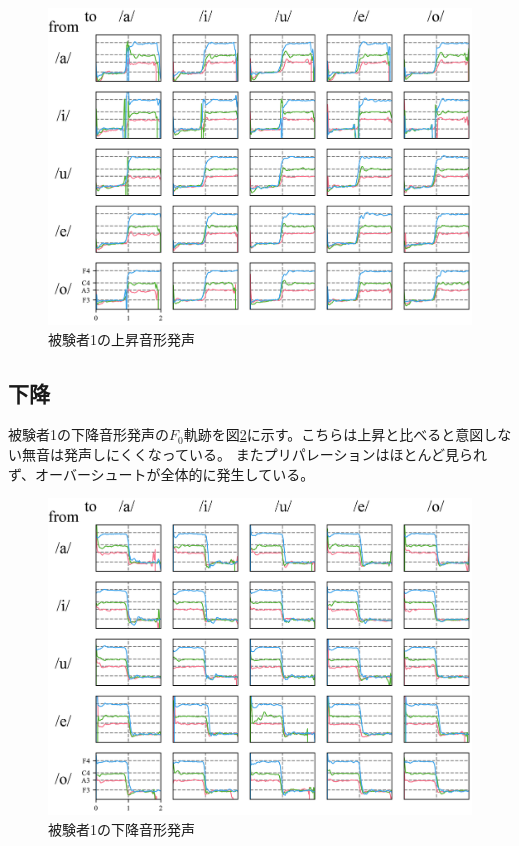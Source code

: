 \documentclass[10.5ptj,a4j,dvipdfmx,uplatex, oneside, openany, report]{jsbook}%
\begin{document}
\begin{figure}[thbp]
    \begin{center}
      \includegraphics[clip,width=16.0cm]{up1.png}
      \caption{被験者1の上昇音形発声}
      \label{u1}
    \end{center}
\end{figure}

\subsection{下降}
被験者1の下降音形発声の$F_0$軌跡を図\ref{d1}に示す。こちらは上昇と比べると意図しない無音は発声しにくくなっている。
またプリパレーションはほとんど見られず、オーバーシュートが全体的に発生している。

\begin{figure}[thbp]
    \begin{center}
      \includegraphics[clip,width=16.0cm]{down1.png}
      \caption{被験者1の下降音形発声}
      \label{d1}
    \end{center}
\end{figure}
\end{document}
